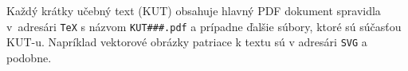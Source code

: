 \documentclass[a4paper, 11pt, ]{article}
\begin{document}
Každý krátky učebný text (KUT) obsahuje hlavný PDF dokument spravidla v~adresári \verb|TeX| s názvom \verb|KUT###.pdf| a prípadne ďalšie súbory, ktoré sú súčasťou KUT-u. Napríklad vektorové obrázky patriace k textu sú v adresári \verb|SVG| a podobne.






\end{document}
